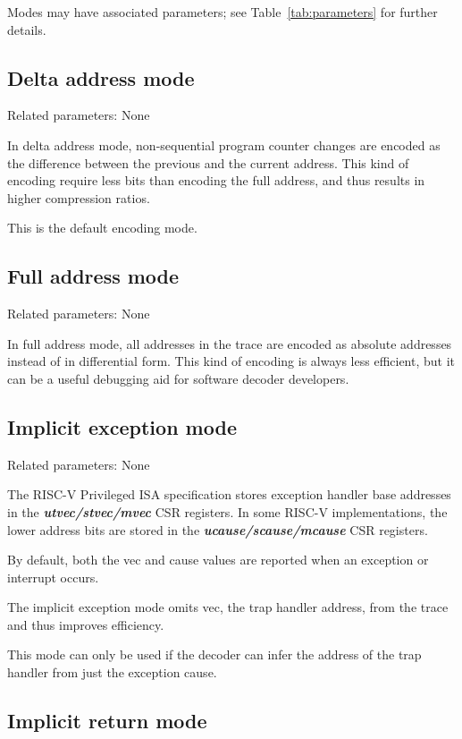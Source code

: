 Modes may have associated parameters; see Table~\ref{tab:parameters} for further details.

\subsection{Delta address mode} \label{sec:delta-address}

Related parameters: None

In delta address mode, non-sequential program counter changes
are encoded as the difference between the previous and the current
address. This kind of encoding require less bits than encoding the
full address, and thus results in higher compression ratios.

This is the default encoding mode.

\subsection{Full address mode} \label{sec:full-address}

Related parameters: None

In full address mode, all addresses in the trace are encoded as absolute addresses instead
of in differential form. This kind of encoding is always less efficient, but it can be a useful 
debugging aid for software decoder developers.

\subsection{Implicit exception mode} \label{sec:implicit-exception}

Related parameters: None

The RISC-V Privileged ISA specification stores exception handler base
addresses in the \textbf{\textit{utvec/stvec/mvec}} CSR registers.
In some RISC-V implementations, the lower address bits are stored in
the \textbf{\textit{ucause/scause/mcause}} CSR registers.

By default, both the vec and cause values are reported when an exception or interrupt occurs.

The implicit exception mode omits vec, the trap handler address, from the trace and
thus improves efficiency.

This mode can only be used if the decoder can infer the address of the trap handler
from just the exception cause.

\subsection{Implicit return mode} \label{sec:implicit-return}

